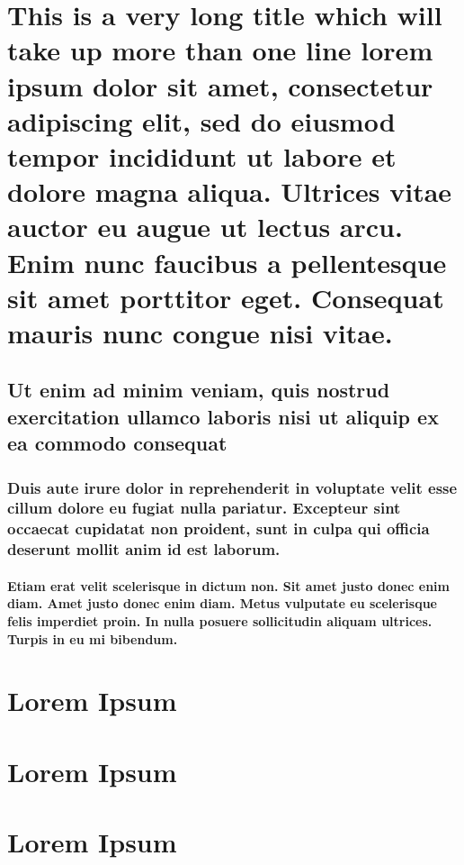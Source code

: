 \documentclass[11pt]{report}
\begin{document}


\chapter{This is a very long title which will take up more than one line
lorem ipsum dolor sit amet, consectetur adipiscing elit, sed do eiusmod
tempor incididunt ut labore et dolore magna aliqua. Ultrices vitae
auctor eu augue ut lectus arcu. Enim nunc faucibus a pellentesque sit
amet porttitor eget. Consequat mauris nunc congue nisi vitae.}
  \label{ch:long-title}

\section{Ut enim ad minim veniam, quis nostrud exercitation ullamco
laboris nisi ut aliquip ex ea commodo consequat}

\subsection{Duis aute irure dolor in reprehenderit in voluptate velit
esse cillum dolore eu fugiat nulla pariatur. Excepteur sint occaecat
cupidatat non proident, sunt in culpa qui officia deserunt mollit anim
id est laborum.}

\subsubsection{Etiam erat velit scelerisque in dictum non. Sit amet
justo donec enim diam. Amet justo donec enim diam. Metus vulputate eu
scelerisque felis imperdiet proin. In nulla posuere sollicitudin aliquam
ultrices. Turpis in eu mi bibendum.}

\chapter{Lorem Ipsum}
\chapter{Lorem Ipsum}
\chapter{Lorem Ipsum}
\end{document}
